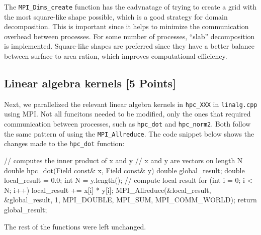 \documentclass[unicode,11pt,a4paper,oneside,numbers=endperiod,openany]{scrartcl}
\begin{document}
The \texttt{MPI\_Dims\_create} function has the eadvnatage of trying to create a
grid with the most square-like shape possible, which is a good strategy for
domain decomposition. This is important since it helps to minimize the
communication overhead between processes. For some number of
processes, ``slab'' decomposition is implemented. Square-like shapes are
preferred since they have a better balance between surface to area ration, which
improves computational efficiency.
\subsection{Linear algebra kernels [5 Points]}
Next, we parallelized the relevant linear algebra kernels in  \texttt{hpc\_XXX}
in \texttt{linalg.cpp} using MPI. Not all funcitons needed to be modified, only
the ones that required communication between processes, such as \texttt{hpc\_dot}
and \texttt{hpc\_norm2}. Both follow the same pattern of using the
\texttt{MPI\_Allreduce}. The code snippet below shows the changes made to the
\texttt{hpc\_dot} function:
\begin{cppverbatim}
// computes the inner product of x and y
// x and y are vectors on length N
double hpc_dot(Field const& x, Field const& y) {
    double global_result;
    double local_result = 0.0;
    int N = y.length();
    // compute local result
    for (int i = 0; i < N; i++) {
        local_result += x[i] * y[i];
    }
    MPI_Allreduce(&local_result, &global_result, 1, MPI_DOUBLE, MPI_SUM, MPI_COMM_WORLD);
    return global_result;
}
\end{cppverbatim}
The rest of the functions were left unchanged.
\end{document}
